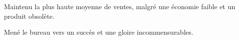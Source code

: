 \begin{achievements}
	\item Maintenu la plus haute moyenne de ventes, malgré une économie faible et un produit obsolète.
	\item Mené le bureau vers un succès et une gloire incommensurables.
\end{achievements}
